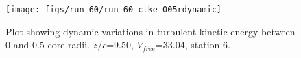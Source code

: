 \begin{figure}[H]
\centering
\texttt{[image: figs/run\_60/run\_60\_ctke\_005rdynamic]}
\caption{Plot showing dynamic variations in turbulent kinetic energy between 0 and 0.5 core radii. $z/c$=9.50, $V_{free}$=33.04, station 6.}
\label{fig:run_60_ctke_005rdynamic}
\end{figure}


